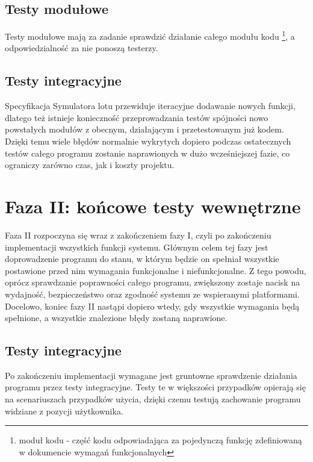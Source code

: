 \documentclass{mwrep}
\begin{document}
\section{Testy modułowe}
Testy modułowe mają za zadanie sprawdzić działanie całego modułu kodu \footnote{moduł kodu - część kodu odpowiadająca za pojedynczą funkcję zdefiniowaną w dokumencie wymagań funkcjonalnych}, a odpowiedzialność za nie ponoszą testerzy.

\section{Testy integracyjne}
Specyfikacja Symulatora lotu przewiduje iteracyjne dodawanie nowych funkcji, dlatego też istnieje konieczność przeprowadzania testów spójności nowo powstałych modułów z obecnym, działającym i przetestowanym już kodem. Dzięki temu wiele błędów normalnie wykrytych dopiero podczas ostatecznych testów całego programu zostanie naprawionych w dużo wcześniejszej fazie, co ograniczy zarówno czas, jak i koszty projektu.

\chapter{Faza II: końcowe testy wewnętrzne}
Faza II rozpoczyna się wraz z zakończeniem fazy I, czyli po zakończeniu implementacji wszystkich funkcji systemu. Głównym celem tej fazy jest doprowadzenie programu do stanu, w którym będzie on spełniał wszystkie postawione przed nim wymagania funkcjonalne i niefunkcjonalne. Z tego powodu, oprócz sprawdzanie poprawności całego programu, zwiększony zostaje nacisk na wydajność, bezpieczeństwo oraz zgodność systemu ze wspieranymi platformami. Docelowo, koniec fazy II nastąpi dopiero wtedy, gdy wszystkie wymagania będą spełnione, a wszystkie znalezione błędy zostaną naprawione.

\section{Testy integracyjne}
Po zakończeniu implementacji wymagane jest gruntowne sprawdzenie działania programu przez testy integracyjne. Testy te w większości przypadków opierają się na scenariuszach przypadków użycia, dzięki czemu testują zachowanie programu widziane z pozycji użytkownika.
\end{document}
